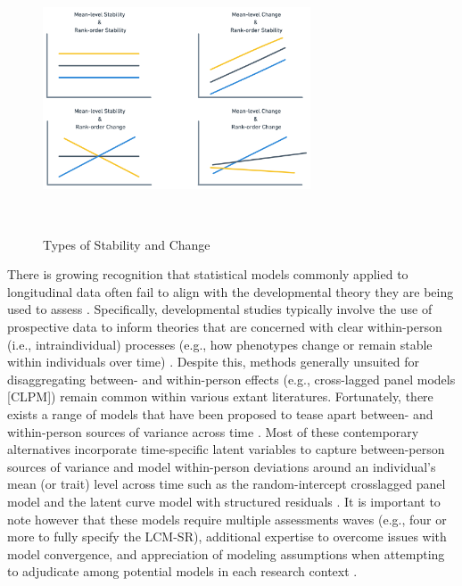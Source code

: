 \documentclass[
  number,
  preprint,
  3p,
  twocolumn]{elsarticle}
\begin{document}
\begin{figure}

\includegraphics[width=3.125in,height=3.125in]{./figures/StabilityChange.png} \hfill{}

\caption{\label{fig-StablityChange}Types of Stability and Change}

\end{figure}

There is growing recognition that statistical models commonly applied to
longitudinal data often fail to align with the developmental theory they
are being used to assess
\citep[e.g.,][]{curran2011, hoffman2015, littlefield2021}. Specifically,
developmental studies typically involve the use of prospective data to
inform theories that are concerned with clear within-person (i.e.,
intraindividual) processes (e.g., how phenotypes change or remain stable
within individuals over time) \citep[e.g.,][]{curran2011}. Despite this,
methods generally unsuited for disaggregating between- and within-person
effects (e.g., cross-lagged panel models {[}CLPM{]}) remain common
within various extant literatures. Fortunately, there exists a range of
models that have been proposed to tease apart between- and within-person
sources of variance across time
\citep[see][]{littlefield2021, orth2021}. Most of these contemporary
alternatives incorporate time-specific latent variables to capture
between-person sources of variance and model within-person deviations
around an individual's mean (or trait) level across time such as the
random-intercept crosslagged panel model \citep[e.g.,
RI-CLPM,][]{hamaker2015} and the latent curve model with structured
residuals \citep[e.g., LCM-SR,][]{curran2014}. It is important to note
however that these models require multiple assessments waves (e.g., four
or more to fully specify the LCM-SR), additional expertise to overcome
issues with model convergence, and appreciation of modeling assumptions
when attempting to adjudicate among potential models in each research
context \citep[see][for further discussion]{littlefield2021}.
\end{document}
